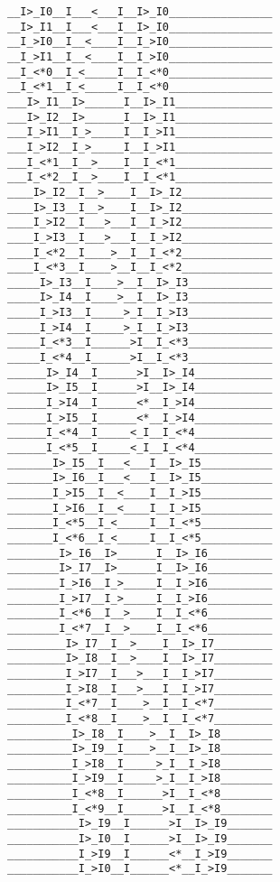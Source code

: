 \documentclass[pra,amsfonts, twocolumn]{revtex4}
\begin{document}
\begin{figure}[t]
 {\tiny
 \begin{verbatim}
__I>_I0__I___<___I__I>_I0________________   __I>_I1__I___<___I__I>_I0________________
__I_>I0__I__<____I__I_>I0________________   __I_>I1__I__<____I__I_>I0________________
__I_<*0__I_<_____I__I_<*0________________   __I_<*1__I_<_____I__I_<*0________________
___I>_I1__I>______I__I>_I1_______________   ___I>_I2__I>______I__I>_I1_______________
___I_>I1__I_>_____I__I_>I1_______________   ___I_>I2__I_>_____I__I_>I1_______________
___I_<*1__I__>____I__I_<*1_______________   ___I_<*2__I__>____I__I_<*1_______________
____I>_I2__I__>____I__I>_I2______________   ____I>_I3__I__>____I__I>_I2______________
____I_>I2__I___>___I__I_>I2______________   ____I_>I3__I___>___I__I_>I2______________
____I_<*2__I____>__I__I_<*2______________   ____I_<*3__I____>__I__I_<*2______________
_____I>_I3__I____>__I__I>_I3_____________   _____I>_I4__I____>__I__I>_I3_____________
_____I_>I3__I_____>_I__I_>I3_____________   _____I_>I4__I_____>_I__I_>I3_____________
_____I_<*3__I______>I__I_<*3_____________   _____I_<*4__I______>I__I_<*3_____________
______I>_I4__I______>I__I>_I4____________   ______I>_I5__I______>I__I>_I4____________
______I_>I4__I______<*__I_>I4____________   ______I_>I5__I______<*__I_>I4____________
______I_<*4__I_____<_I__I_<*4____________   ______I_<*5__I_____<_I__I_<*4____________
_______I>_I5__I___<___I__I>_I5___________   _______I>_I6__I___<___I__I>_I5___________
_______I_>I5__I__<____I__I_>I5___________   _______I_>I6__I__<____I__I_>I5___________
_______I_<*5__I_<_____I__I_<*5___________   _______I_<*6__I_<_____I__I_<*5___________
________I>_I6__I>______I__I>_I6__________   ________I>_I7__I>______I__I>_I6__________
________I_>I6__I_>_____I__I_>I6__________   ________I_>I7__I_>_____I__I_>I6__________
________I_<*6__I__>____I__I_<*6__________   ________I_<*7__I__>____I__I_<*6__________
_________I>_I7__I__>____I__I>_I7_________   _________I>_I8__I__>____I__I>_I7_________
_________I_>I7__I___>___I__I_>I7_________   _________I_>I8__I___>___I__I_>I7_________
_________I_<*7__I____>__I__I_<*7_________   _________I_<*8__I____>__I__I_<*7_________
__________I>_I8__I____>__I__I>_I8________   __________I>_I9__I____>__I__I>_I8________
__________I_>I8__I_____>_I__I_>I8________   __________I_>I9__I_____>_I__I_>I8________
__________I_<*8__I______>I__I_<*8________   __________I_<*9__I______>I__I_<*8________
___________I>_I9__I______>I__I>_I9_______   ___________I>_I0__I______>I__I>_I9_______
___________I_>I9__I______<*__I_>I9_______   ___________I_>I0__I______<*__I_>I9_______

\end{verbatim}}
\end{figure}
\end{document}
